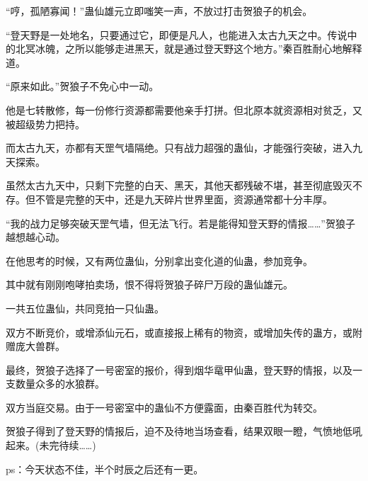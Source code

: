 \begin{this_body}
“哼，孤陋寡闻！”蛊仙雄元立即嗤笑一声，不放过打击贺狼子的机会。

“登天野是一处地名，只要通过它，即便是凡人，也能进入太古九天之中。传说中的北冥冰魄，之所以能够走进黑天，就是通过登天野这个地方。”秦百胜耐心地解释道。

“原来如此。”贺狼子不免心中一动。

他是七转散修，每一份修行资源都需要他亲手打拼。但北原本就资源相对贫乏，又被超级势力把持。

而太古九天，亦都有天罡气墙隔绝。只有战力超强的蛊仙，才能强行突破，进入九天探索。

虽然太古九天中，只剩下完整的白天、黑天，其他天都残破不堪，甚至彻底毁灭不存。但不管是完整的天中，还是九天碎片世界里面，资源通常都十分丰厚。

“我的战力足够突破天罡气墙，但无法飞行。若是能得知登天野的情报……”贺狼子越想越心动。

在他思考的时候，又有两位蛊仙，分别拿出变化道的仙蛊，参加竞争。

其中就有刚刚咆哮拍卖场，恨不得将贺狼子碎尸万段的蛊仙雄元。

一共五位蛊仙，共同竞拍一只仙蛊。

双方不断竞价，或增添仙元石，或直接报上稀有的物资，或增加失传的蛊方，或附赠庞大兽群。

最终，贺狼子选择了一号密室的报价，得到烟华鼋甲仙蛊，登天野的情报，以及一支数量众多的水狼群。

双方当庭交易。由于一号密室中的蛊仙不方便露面，由秦百胜代为转交。

贺狼子得到了登天野的情报后，迫不及待地当场查看，结果双眼一瞪，气愤地低吼起来。(未完待续……)

ps：今天状态不佳，半个时辰之后还有一更。

\end{this_body}

